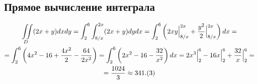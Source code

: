 \subsection{Прямое вычисление интеграла}

\begin{multline}
	\iint\limits_D(2x+y)dxdy = \int_2^6\int_{8/x}^{2x} (2x+y) dy dx = \int_2^6 \left(2xy\Bigr|_{8/x}^{2x} + \frac{y^2}{2}\Bigr|_{8/x}^{2x} \right)dx = \\
	= \int_2^6 \left(4x^2 - 16 + \frac{4x^2}{2} - \frac{64}{2x^2}\right) = \int_2^6\left(
		2x^2-16-\frac{32}{x^2}\right)dx = 2x^3\Bigr|_2^6 - 16x\Bigr|_2^6 + \frac{32}{x}\Bigr|_2^6 =\\
	= \frac{1024}{3} \approx 341.(3)
\end{multline}
